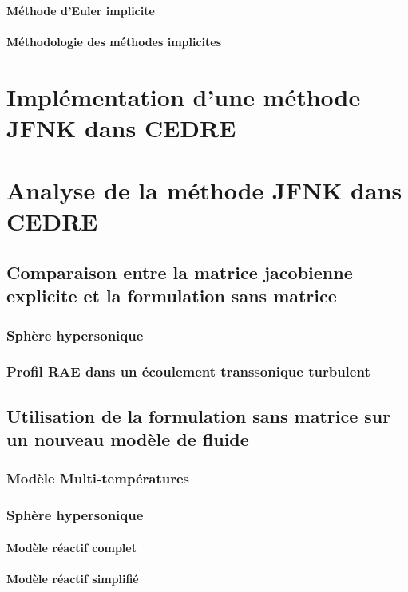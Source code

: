       \subsubsection{Méthode d'Euler implicite}
      \subsubsection{Méthodologie des méthodes implicites}




\chapter{Implémentation d'une méthode JFNK dans CEDRE}

\chapter{Analyse de la méthode JFNK dans CEDRE}
  \section{Comparaison entre la matrice jacobienne explicite et la formulation sans matrice}
    \subsection{Sphère hypersonique}
    \subsection{Profil RAE dans un écoulement transsonique turbulent}
  \section{Utilisation de la formulation sans matrice sur un nouveau modèle de fluide}
    \subsection{Modèle Multi-températures}
    \subsection{Sphère hypersonique}
      \subsubsection{Modèle réactif complet}
      \subsubsection{Modèle réactif simplifié}


